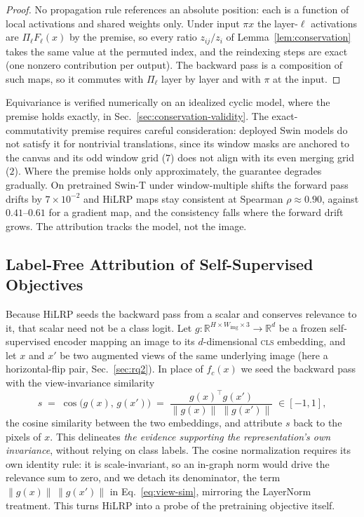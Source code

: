 \documentclass[lettersize,journal]{IEEEtran}
\theoremstyle{definition}
\theoremstyle{plain}
\begin{document}
\begin{proof}
No propagation rule references an absolute position: each is a function of local activations and shared weights only. Under input $\pi x$ the layer-$\ell$ activations are $\Pi_\ell F_\ell(x)$ by the premise, so every ratio $z_{ij}/z_i$ of Lemma~\ref{lem:conservation} takes the same value at the permuted index, and the reindexing steps are exact (one nonzero contribution per output). The backward pass is a composition of such maps, so it commutes with $\Pi_\ell$ layer by layer and with $\pi$ at the input.
\end{proof}
Equivariance is verified numerically on an idealized cyclic model, where the premise holds exactly, in Sec.~\ref{sec:conservation-validity}. The exact-commutativity premise requires careful consideration: deployed Swin models do not satisfy it for nontrivial translations, since its window masks are anchored to the canvas and its odd window grid ($7$) does not align with its even merging grid ($2$). Where the premise holds only approximately, the guarantee degrades gradually. On pretrained Swin-T under window-multiple shifts the forward pass drifts by $7\times10^{-2}$ and HiLRP maps stay consistent at Spearman $\rho{\approx}0.90$, against $0.41$--$0.61$ for a gradient map, and the consistency falls where the forward drift grows. The attribution tracks the model, not the image.

\subsection{Label-Free Attribution of Self-Supervised Objectives}
\label{sec:ssl} Because HiLRP seeds the backward pass from a scalar and conserves relevance to it, that scalar need not be a class logit. Let $g:\mathbb{R}^{H\times W_{\mathrm{img}}\times 3}\to\mathbb{R}^{d}$ be a frozen self-supervised encoder mapping an image to its $d$-dimensional \textsc{cls} embedding, and let $x$ and $x'$ be two augmented views of the same underlying image (here a horizontal-flip pair, Sec.~\ref{sec:rq2}). In place of $f_c(x)$ we seed the backward pass with the view-invariance similarity
\begin{equation}
\label{eq:view-sim}
s \;=\; \cos\!\big(g(x),\,g(x')\big)
  \;=\; \frac{g(x)^{\!\top} g(x')}{\lVert g(x)\rVert\;\lVert g(x')\rVert}
  \;\in[-1,1],
\end{equation}
the cosine similarity between the two embeddings, and attribute $s$ back to the pixels of $x$. This delineates \emph{the evidence supporting the representation's own invariance}, without relying on class labels. The cosine normalization requires its own identity rule: it is scale-invariant, so an in-graph norm would drive the relevance sum to zero, and we detach its denominator, the term $\lVert g(x)\rVert\,\lVert g(x')\rVert$ in Eq.~\eqref{eq:view-sim}, mirroring the LayerNorm treatment. This turns HiLRP into a probe of the pretraining objective itself.
\end{document}
